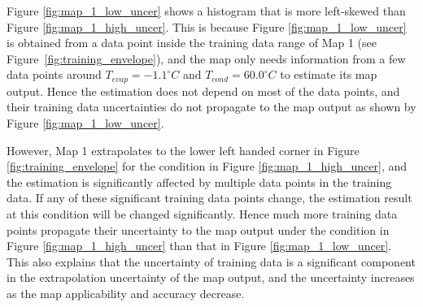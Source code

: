 Figure \ref{fig:map_1_low_uncer} shows a histogram that is more left-skewed than Figure \ref{fig:map_1_high_uncer}. This is because Figure \ref{fig:map_1_low_uncer} is obtained from a data point inside the training data range of Map 1 (see Figure~\ref{fig:training_envelope}), and the map only needs information from a few data points around $T_{evap} = -1.1^\circ C$ and $T_{cond} = 60.0^\circ C$ to estimate its map output. Hence the estimation does not depend on most of the data points, and their training data uncertainties do not propagate to the map output as shown by Figure \ref{fig:map_1_low_uncer}. 

However, Map 1 extrapolates to the lower left handed corner in Figure \ref{fig:training_envelope} for the condition in Figure \ref{fig:map_1_high_uncer}, and the estimation is significantly affected by multiple data points in the training data. If any of these significant training data points change, the estimation result at this condition will be changed significantly. Hence much more training data points propagate their uncertainty to the map output under the condition in Figure \ref{fig:map_1_high_uncer} than that in Figure \ref{fig:map_1_low_uncer}. This also explains that the uncertainty of training data is a significant component in the extrapolation uncertainty of the map output, and the uncertainty increases as the map applicability and accuracy decrease.
